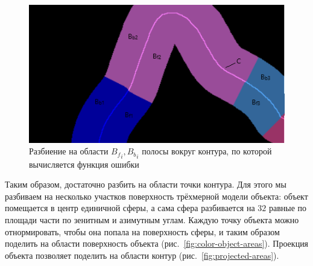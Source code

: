 \begin{figure}[t]
\centering
\includegraphics[width=\textwidth]{fig/fb_contour.png}
\caption{
Разбиение на области ${B_f}_i, {B_b}_i$ полосы вокруг контура, по которой
вычисляется функция ошибки
} \label{fig:fb_contour}
\end{figure}

Таким образом, достаточно разбить на области точки контура.
Для этого мы разбиваем на несколько участков поверхность трёхмерной модели
объекта: объект помещается в центр единичной сферы, а сама сфера разбивается
на $32$ равные по площади части по зенитным и азимутным углам.
Каждую точку объекта можно отнормировать, чтобы она попала на поверхность
сферы, и таким образом поделить на области поверхность объекта
(рис.~\ref{fig:color-object-areas}).
Проекция объекта позволяет поделить на области контур
(рис.~\ref{fig:projected-areas}).

